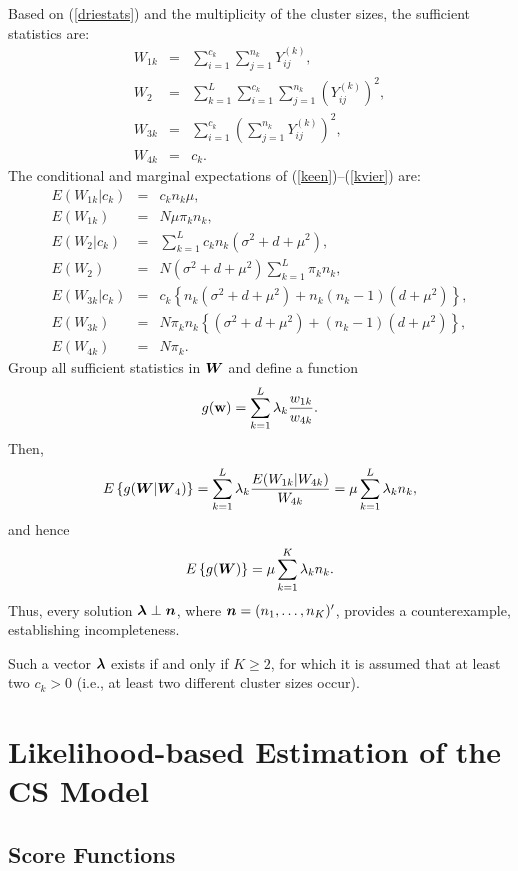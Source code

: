 \documentclass[11pt,a5paper,twoside]{book}
\newcommand{\bn}{\mbox{\boldmath $n$}}
\newcommand{\bw}{{\bf w}}
\newcommand{\BW}{\mbox{\boldmath $W$}}
\newcommand{\bflambda}{\mbox{\boldmath $\lambda$}}
\begin{document}
{Based on (\ref{driestats})
and the multiplicity of the cluster sizes, the sufficient statistics are:
\begin{eqnarray}
W_{1k}&=&\sum_{i=1}^{c_k}\sum_{j=1}^{n_k}Y_{ij}^{(k)},\label{keen}\\
W_2&=&\sum_{k=1}^L\sum_{i=1}^{c_k}\sum_{j=1}^{n_k}\left(Y_{ij}^{(k)}\right)^2,\label{ktwee}\\
W_{3k}&=&\sum_{i=1}^{c_k}\left(\sum_{j=1}^{n_k}Y_{ij}^{(k)}\right)^2,\label{kdrie}\\
W_{4k}&=&c_k.\label{kvier}
\end{eqnarray}
The conditional and marginal expectations of (\ref{keen})--(\ref{kvier}) are:
\[
\begin{aligned}
E(W_{1k}|c_k)&=&c_k n_k\mu,\\
E(W_{1k})&=&N\mu\pi_k n_k,\\
E(W_{2}|c_k)&=&\sum_{k=1}^Lc_k n_k(\sigma^2+d+\mu^2),\\
E(W_{2})&=&N(\sigma^2+d+\mu^2)\sum_{k=1}^L\pi_k n_k,\\
E(W_{3k}|c_k)&=&c_k\left\{
n_k(\sigma^2+d+\mu^2)+n_k(n_k-1)(d+\mu^2)\right\},\\
E(W_{3k})&=&N\pi_k n_k
\left\{
(\sigma^2+d+\mu^2)+(n_k-1)(d+\mu^2)
\right\}
,\\
E(W_{4k})&=&N\pi_k.
\end{aligned}
\]
Group all sufficient statistics in $\BW$ and define a function
\begin{equation}
\label{gcluster}
g(\bw)=\sum_{k=1}^L\lambda_k\frac{w_{1k}}{w_{4k}}.
\end{equation}
Then,
$$E\left\{g(\BW|\BW_4)\right\}=
\sum_{k=1}^L\lambda_k\frac{E(W_{1k}|W_{4k})}{W_{4k}}=
\mu\sum_{k=1}^L\lambda_k n_k,
$$
and hence
$$E\left\{g(\BW)\right\}=
\mu\sum_{k=1}^K\lambda_k n_k.$$
Thus, every solution $\bflambda \perp \bn$, where $\bn=(n_1,\dots,n_K)'$, provides a counterexample, establishing incompleteness.

Such a vector $\bflambda$ exists if and only if $K\ge 2$, for which it is assumed that at least two $c_k>0$ (i.e., at least two different cluster sizes occur).

\setcounter{equation}{0}
\section{Likelihood-based Estimation of the CS Model}
\label{likelihoodapp}

\subsection{Score Functions}

}
\end{document}
